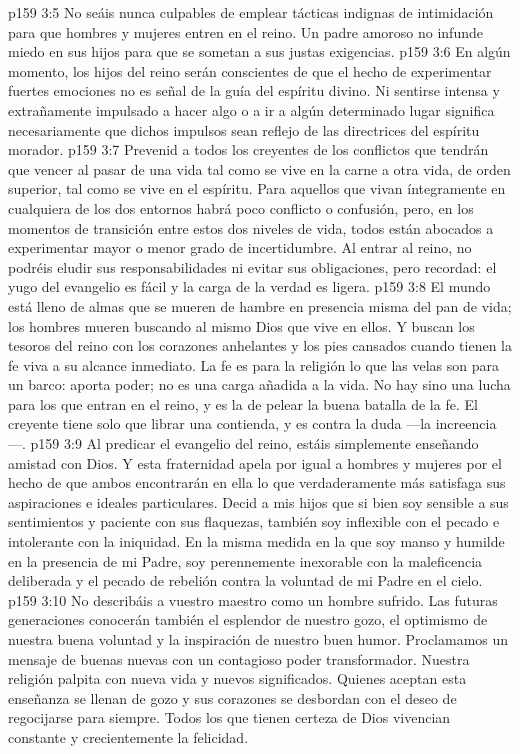 \vs p159 3:5 No seáis nunca culpables de emplear tácticas indignas de intimidación para que hombres y mujeres entren en el reino. Un padre amoroso no infunde miedo en sus hijos para que se sometan a sus justas exigencias.
\vs p159 3:6 En algún momento, los hijos del reino serán conscientes de que el hecho de experimentar fuertes emociones no es señal de la guía del espíritu divino. Ni sentirse intensa y extrañamente impulsado a hacer algo o a ir a algún determinado lugar significa necesariamente que dichos impulsos sean reflejo de las directrices del espíritu morador.
\vs p159 3:7 Prevenid a todos los creyentes de los conflictos que tendrán que vencer al pasar de una vida tal como se vive en la carne a otra vida, de orden superior, tal como se vive en el espíritu. Para aquellos que vivan íntegramente en cualquiera de los dos entornos habrá poco conflicto o confusión, pero, en los momentos de transición entre estos dos niveles de vida, todos están abocados a experimentar mayor o menor grado de incertidumbre. Al entrar al reino, no podréis eludir sus responsabilidades ni evitar sus obligaciones, pero recordad: el yugo del evangelio es fácil y la carga de la verdad es ligera.
\vs p159 3:8 El mundo está lleno de almas que se mueren de hambre en presencia misma del pan de vida; los hombres mueren buscando al mismo Dios que vive en ellos. Y buscan los tesoros del reino con los corazones anhelantes y los pies cansados cuando tienen la fe viva a su alcance inmediato. La fe es para la religión lo que las velas son para un barco: aporta poder; no es una carga añadida a la vida. No hay sino una lucha para los que entran en el reino, y es la de pelear la buena batalla de la fe. El creyente tiene solo que librar una contienda, y es contra la duda ---la increencia---.
\vs p159 3:9 Al predicar el evangelio del reino, estáis simplemente enseñando amistad con Dios. Y esta fraternidad apela por igual a hombres y mujeres por el hecho de que ambos encontrarán en ella lo que verdaderamente más satisfaga sus aspiraciones e ideales particulares. Decid a mis hijos que si bien soy sensible a sus sentimientos y paciente con sus flaquezas, también soy inflexible con el pecado e intolerante con la iniquidad. En la misma medida en la que soy manso y humilde en la presencia de mi Padre, soy perennemente inexorable con la maleficencia deliberada y el pecado de rebelión contra la voluntad de mi Padre en el cielo.
\vs p159 3:10 No describáis a vuestro maestro como un hombre sufrido. Las futuras generaciones conocerán también el esplendor de nuestro gozo, el optimismo de nuestra buena voluntad y la inspiración de nuestro buen humor. Proclamamos un mensaje de buenas nuevas con un contagioso poder transformador. Nuestra religión palpita con nueva vida y nuevos significados. Quienes aceptan esta enseñanza se llenan de gozo y sus corazones se desbordan con el deseo de regocijarse para siempre. Todos los que tienen certeza de Dios vivencian constante y crecientemente la felicidad.
